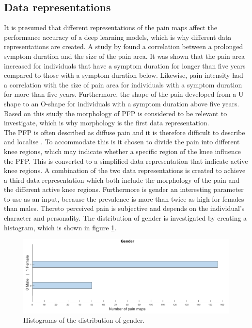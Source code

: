 \subsection{Data representations} \label{sec:representation}
It is presumed that different representations of the pain maps affect the performance accuracy of a deep learning models, which is why different data representations are created. 
A study by \citeauthor{Boudreau2017} found a correlation between a prolonged symptom duration and the size of the pain area. It was shown that the pain area increased for individuals that have a symptom duration for longer than five years compared to those with a symptom duration below. Likewise, pain intensity had a correlation with the size of pain area for individuals with a symptom duration for more than five years. Furthermore, the shape of the pain developed from a U-shape to an O-shape for individuals with a symptom duration above five years.\citep{Boudreau2017} \\
Based on this study the morphology of PFP is considered to be relevant to investigate, which is why morphology is the first data representation.\\

\noindent
The PFP is often described as diffuse pain and it is therefore difficult to describe and localise \citep{Witvrouw2014}. To accommodate this is it chosen to divide the pain into different knee regions, which may indicate whether a specific region of the knee influence the PFP. This is converted to a simplified data representation that indicate active knee regions. 
A combination of the two data representations is created to achieve a third data representation which both include the morphology of the pain and the different active knee regions. 
\noindent
Furthermore is gender an interesting parameter to use as an input, because the prevalence is more than twice as high for females than males. Thereto perceived pain is subjective and depends on the individual's character and personality. The distribution of gender is investigated by creating a histogram, which is shown in figure \ref{fig:histogender}. 

\begin{figure} [H]
\centering
\includegraphics[width=1\textwidth]{figures/histoGender}
\caption{Histograms of the distribution of gender.}
\label{fig:histogender}
\end{figure}

